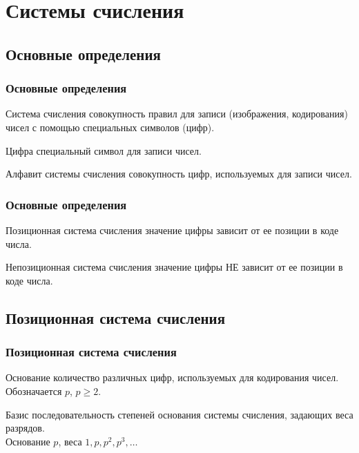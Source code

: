 \subtitle{Лекция 1 --- Системы счисления}
\frame[plain]
{\titlepage}	%

	\section{Системы счисления}
	\subsection{Основные определения}
	
\begin{frame}
\frametitle{Основные определения}
\begin{block}{Система счисления}
  совокупность правил для записи (изображения, кодирования) чисел с помощью специальных символов (цифр).
\end{block}

\begin{block}{Цифра}
  специальный символ для записи чисел.
\end{block}

\begin{block}{Алфавит системы счисления}
  совокупность цифр, используемых для записи чисел.
\end{block}

\end{frame}

\begin{frame}
\frametitle{Основные определения}

\begin{block}{Позиционная система счисления}
  значение цифры зависит от ее позиции в коде числа.
\end{block}

\begin{block}{Непозиционная система счисления}
  значение цифры НЕ зависит от ее позиции в коде числа.
\end{block}

\end{frame}

\begin{frame}

\subsection{Позиционная система счисления}
\frametitle{Позиционная система счисления}

\begin{block}{Основание}
  количество различных цифр, используемых для кодирования чисел.\\
	Обозначается $p$, $p\geq 2$.
\end{block}

\begin{block}{Базис}
  последовательность степеней основания системы счисления, задающих веса разрядов.\\
	Основание $p$, веса $1,p,p^2,p^3, \ldots$
\end{block}

\end{frame}

